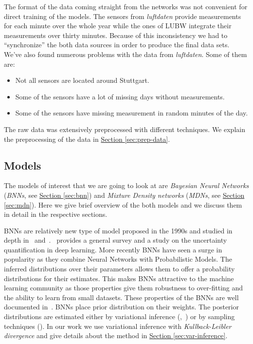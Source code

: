 \documentclass[12pt,a4paper,twoside]{scrartcl}
\numberwithin{equation}{section}
\newcommand{\refsec}[1]{\hyperref[#1]{Section \ref*{#1}}}
\begin{document}
The format of the data coming straight from the networks was not convenient for direct training of the models. The sensors from \emph{luftdaten} provide measurements for each minute over the whole year while the ones of LUBW integrate their measurements over thirty minutes. Because of this inconsistency we had to ``synchronize'' the both data sources in order to produce the final data sets. We've also found numerous problems with the data from \emph{luftdaten}. Some of them are:
\begin{itemize}
\item Not all sensors are located around Stuttgart.
\item Some of the sensors have a lot of missing days without measurements.
\item Some of the sensors have missing measurement in random minutes of the day.
\end{itemize}
The raw data was extensively preprocessed with different techniques. We explain the preprocessing of the data in \refsec{sec:prep-data}.
\subsection{Models}\label{sec:models}
The models of interest that we are going to look at are \emph{Bayesian Neural Networks} (\emph{BNNs}, see \refsec{sec:bnn}) and \emph{Mixture Density networks} (\emph{MDNs}, see \refsec{sec:mdn}). Here we give brief overview of the both models and we discuss them in detail in the respective sections.

BNNs are relatively new type of model proposed in the 1990s and studied in depth in~\cite{mackay1992} and~\cite{neal1996}.~\cite{gal2016} provides a general survey and a study on the uncertainty quantification in deep learning. More recently BNNs have seen a surge in popularity as they combine Neural Networks with Probabilistic Models. The inferred distributions over their parameters allows them to offer a probability distributions for their estimates. This makes BNNs attractive to the machine learning community as those properties give them robustness to over-fitting and the ability to learn from small datasets. These properties of the BNNs are well documented in~\cite{neal1996}. BNNs place prior distribution on their weights. The posterior distributions are estimated either by variational inference (\cite{blundell2015},~\cite{paisley2012}) or by sampling techniques (\cite{vehtari2000}). In our work we use variational inference with \emph{Kullback-Leibler divergence} and give details about the method in \refsec{sec:var-inference}.
\end{document}
